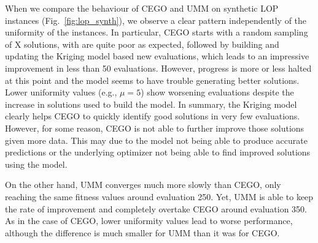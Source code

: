 \documentclass[runningheads]{llncs}
\begin{document}
When we compare the behaviour of CEGO and UMM on synthetic LOP instances
(Fig.~\ref{fig:lop_synth}), we observe a clear pattern independently of the
uniformity of the instances. In particular, CEGO starts with a random sampling
of X solutions, with are quite poor as expected, followed by building and
updating the Kriging model based new evaluations, which leads to an impressive
improvement in less than 50 evaluations. However, progress is more or less
halted at this point and the model seems to have trouble generating better
solutions. Lower uniformity values (e.g., $\mu=5$) show worsening evaluations
despite the increase in solutions used to build the model. In summary, the
Kriging model clearly helps CEGO to quickly identify good solutions in very few
evaluations. However, for some reason, CEGO is not able to further improve
those solutions given more data. This may due to the model not being able to
produce accurate predictions or the underlying optimizer not being able to find
improved solutions using the model.


On the other hand, UMM converges much more slowly than CEGO, only reaching the
same fitness values around evaluation 250. Yet, UMM is able to keep the rate of
improvement and completely overtake CEGO around evaluation 350. As in the case
of CEGO, lower uniformity values lead to worse performance, although the
difference is much smaller for UMM than it was for CEGO.


\newcommand{\supplement}{\citep{Supplementary}}
\end{document}

